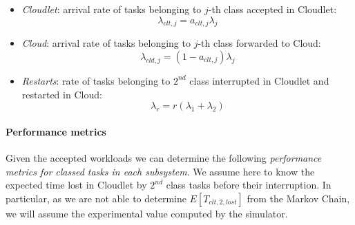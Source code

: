 \begin{itemize}
	\item \textit{Cloudlet}: arrival rate of tasks belonging to $j$-th class accepted in Cloudlet:
	\begin{equation}
	\lambda_{clt,j} = a_{clt,j}\lambda_{j}
	\end{equation}
	
	\item \textit{Cloud}: arrival rate of tasks belonging to $j$-th class forwarded to Cloud:
	\begin{equation}
	\lambda_{cld,j} = (1-a_{clt,j})\lambda_{j}
	\end{equation}
	
	\item \textit{Restarts}: rate of tasks belonging to $2^{nd}$ class interrupted in Cloudlet and restarted in Cloud:
	\begin{equation}
	\lambda_{r} = r(\lambda_{1}+\lambda_{2})
	\end{equation}
\end{itemize}

\paragraph{Performance metrics}
Given the accepted workloads we can determine the following \textit{performance metrics for classed tasks in each subsystem}.
%
We assume here to know the expected time lost in Cloudlet by $2^{nd}$ class tasks before their interruption. In particular, as we are not able to determine $E[T_{clt,2,lost}]$ from the Markov Chain, we will assume the experimental value computed by the simulator.

